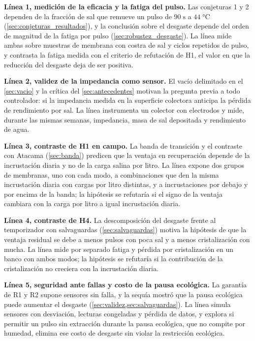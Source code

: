 \textbf{L\'inea 1, medici\'on de la eficacia y la fatiga del pulso.} Las conjeturas 1 y 2 dependen de la fracci\'on de sal que remueve un pulso de $90\;\text{s}$ a $44\;\si{\celsius}$ (\cref{sec:conjeturas_resultados}), y la conclusi\'on sobre el desgaste depende del orden de magnitud de la fatiga por pulso (\cref{sec:robustez_desgaste}). La l\'inea mide ambas sobre muestras de membrana con costra de sal y ciclos repetidos de pulso, y contrasta la fatiga medida con el criterio de refutaci\'on de H1, el valor en que la reducci\'on del desgaste deja de ser positiva.

\textbf{L\'inea 2, validez de la impedancia como sensor.} El vac\'io delimitado en el \cref{sec:vacio} y la cr\'itica del \cref{sec:antecedentes} motivan la pregunta previa a todo controlador: si la impedancia medida en la superficie colectora anticipa la p\'erdida de rendimiento por sal. La l\'inea instrumenta un colector con electrodos y mide, durante las mismas semanas, impedancia, masa de sal depositada y rendimiento de agua.

\textbf{L\'inea 3, contraste de H1 en campo.} La banda de transici\'on y el contraste con Atacama (\cref{sec:banda}) predicen que la ventaja en recuperaci\'on depende de la incrustaci\'on diaria y no de la carga salina por litro. La l\'inea expone dos grupos de membranas, uno con cada modo, a combinaciones que den la misma incrustaci\'on diaria con cargas por litro distintas, y a incrustaciones por debajo y por encima de la banda; la hip\'otesis se refutar\'ia si el signo de la ventaja cambiara con la carga por litro a igual incrustaci\'on diaria.

\textbf{L\'inea 4, contraste de H4.} La descomposici\'on del desgaste frente al temporizador con salvaguardas (\cref{sec:salvaguardas}) motiva la hip\'otesis de que la ventaja residual se debe a menos pulsos con poca sal y a menos cristalizaci\'on con mucha. La l\'inea mide por separado fatiga y p\'erdida por cristalizaci\'on en un banco con ambos modos; la hip\'otesis se refutar\'ia si la contribuci\'on de la cristalizaci\'on no creciera con la incrustaci\'on diaria.

\textbf{L\'inea 5, seguridad ante fallas y costo de la pausa ecol\'ogica.} La garant\'ia de R1 y R2 supone sensores sin falla, y la sequ\'ia mostr\'o que la pausa ecol\'ogica puede aumentar el desgaste (\cref{sec:validez,sec:salvaguardas}). La l\'inea simula sensores con desviaci\'on, lecturas congeladas y p\'erdida de datos, y explora si permitir un pulso sin extracci\'on durante la pausa ecol\'ogica, que no compite por humedad, elimina ese costo de desgaste sin violar la restricci\'on ecol\'ogica.

